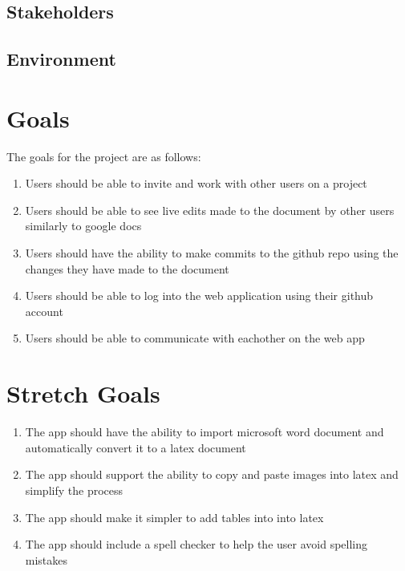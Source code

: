 \documentclass{article}
\begin{document}
\subsection{Stakeholders}

\subsection{Environment}


\section{Goals}

The goals for the project are as follows:

\begin{enumerate}
	\item Users should be able to invite and work with other users on a project
	\item Users should be able to see live edits made to the document by other users similarly to google docs
	\item Users should have the ability to make commits to the github repo using the changes they have made to the document
	\item Users should be able to log into the web application using their github account
	\item Users should be able to communicate with eachother on the web app
\end{enumerate}

\section{Stretch Goals}

\begin{enumerate}
	\item The app should have the ability to import microsoft word document and automatically convert it to a latex document
	\item The app should support the ability to copy and paste images into latex and simplify the process
	\item The app should make it simpler to add tables into into latex
	\item The app should include a spell checker to help the user avoid spelling mistakes
\end{enumerate}
\end{document}
